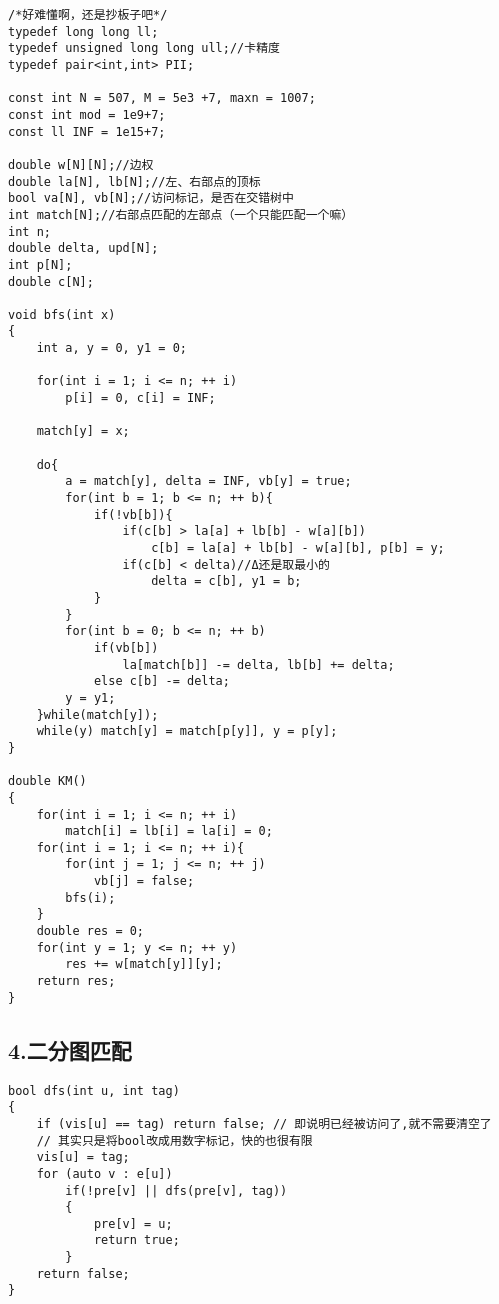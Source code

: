 \documentclass[]{article}
\begin{document}
\begin{verbatim}
/*好难懂啊，还是抄板子吧*/
typedef long long ll;
typedef unsigned long long ull;//卡精度
typedef pair<int,int> PII;

const int N = 507, M = 5e3 +7, maxn = 1007;
const int mod = 1e9+7;
const ll INF = 1e15+7;

double w[N][N];//边权
double la[N], lb[N];//左、右部点的顶标
bool va[N], vb[N];//访问标记，是否在交错树中
int match[N];//右部点匹配的左部点（一个只能匹配一个嘛）
int n;
double delta, upd[N];
int p[N];
double c[N];

void bfs(int x)
{
    int a, y = 0, y1 = 0;

    for(int i = 1; i <= n; ++ i)
        p[i] = 0, c[i] = INF;

    match[y] = x;

    do{
        a = match[y], delta = INF, vb[y] = true;
        for(int b = 1; b <= n; ++ b){
            if(!vb[b]){
                if(c[b] > la[a] + lb[b] - w[a][b])
                    c[b] = la[a] + lb[b] - w[a][b], p[b] = y;
                if(c[b] < delta)//Δ还是取最小的
                    delta = c[b], y1 = b;
            }
        }
        for(int b = 0; b <= n; ++ b)
            if(vb[b])
                la[match[b]] -= delta, lb[b] += delta;
            else c[b] -= delta;
        y = y1;
    }while(match[y]);
    while(y) match[y] = match[p[y]], y = p[y];
}

double KM()
{
    for(int i = 1; i <= n; ++ i)
        match[i] = lb[i] = la[i] = 0;
    for(int i = 1; i <= n; ++ i){
        for(int j = 1; j <= n; ++ j)
            vb[j] = false;
        bfs(i);
    }
    double res = 0;
    for(int y = 1; y <= n; ++ y)
        res += w[match[y]][y];
    return res;
}
\end{verbatim}

\hypertarget{ux4e8cux5206ux56feux5339ux914d}{%
\subsection{4.二分图匹配}\label{ux4e8cux5206ux56feux5339ux914d}}

\begin{verbatim}
bool dfs(int u, int tag)
{
    if (vis[u] == tag) return false; // 即说明已经被访问了,就不需要清空了
    // 其实只是将bool改成用数字标记，快的也很有限
    vis[u] = tag;
    for (auto v : e[u])
        if(!pre[v] || dfs(pre[v], tag))
        {
            pre[v] = u;
            return true;
        }
    return false;
}
\end{verbatim}
\end{document}
